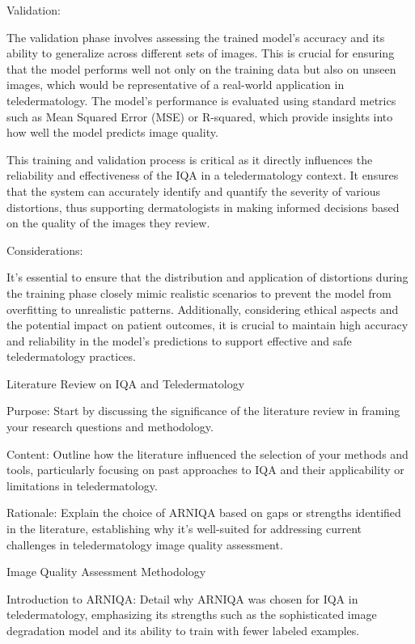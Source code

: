 \noindent
Validation:\par
The validation phase involves assessing the trained model's accuracy and its ability to generalize across different sets of images. This is crucial for ensuring that the model performs well not only on the training data but also on unseen images, which would be representative of a real-world application in teledermatology. The model's performance is evaluated using standard metrics such as Mean Squared Error (MSE) or R-squared, which provide insights into how well the model predicts image quality.\par
\noindent
This training and validation process is critical as it directly influences the reliability and effectiveness of the IQA in a teledermatology context. It ensures that the system can accurately identify and quantify the severity of various distortions, thus supporting dermatologists in making informed decisions based on the quality of the images they review.\par
\noindent
Considerations:\par
It's essential to ensure that the distribution and application of distortions during the training phase closely mimic realistic scenarios to prevent the model from overfitting to unrealistic patterns. Additionally, considering ethical aspects and the potential impact on patient outcomes, it is crucial to maintain high accuracy and reliability in the model's predictions to support effective and safe teledermatology practices.\par
Literature Review on IQA and Teledermatology \par
Purpose: Start by discussing the significance of the literature review in framing your research questions and methodology.\par
\noindent
Content: Outline how the literature influenced the selection of your methods and tools, particularly focusing on past approaches to IQA and their applicability or limitations in teledermatology.\par
\noindent
Rationale: Explain the choice of ARNIQA based on gaps or strengths identified in the literature, establishing why it's well-suited for addressing current challenges in teledermatology image quality assessment.\par
\noindent
Image Quality Assessment Methodology \par
Introduction to ARNIQA: Detail why ARNIQA was chosen for IQA in teledermatology, emphasizing its strengths such as the sophisticated image degradation model and its ability to train with fewer labeled examples.\par
